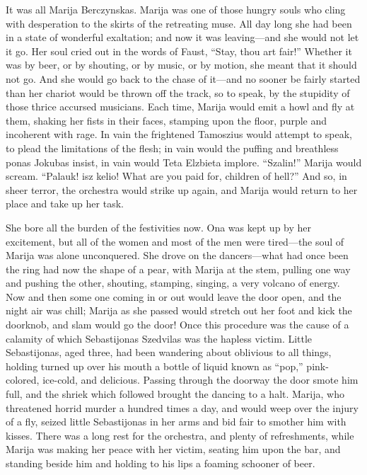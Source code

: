 \documentclass[
]{book}
\theoremstyle{definition}
\theoremstyle{definition}
\theoremstyle{definition}
\theoremstyle{definition}
\theoremstyle{remark}
\begin{document}
It was all Marija Berczynskas. Marija was one of those hungry souls who cling with desperation to the skirts of the retreating muse. All day long she had been in a state of wonderful exaltation; and now it was leaving---and she would not let it go. Her soul cried out in the words of Faust, ``Stay, thou art fair!'' Whether it was by beer, or by shouting, or by music, or by motion, she meant that it should not go. And she would go back to the chase of it---and no sooner be fairly started than her chariot would be thrown off the track, so to speak, by the stupidity of those thrice accursed musicians. Each time, Marija would emit a howl and fly at them, shaking her fists in their faces, stamping upon the floor, purple and incoherent with rage. In vain the frightened Tamoszius would attempt to speak, to plead the limitations of the flesh; in vain would the puffing and breathless ponas Jokubas insist, in vain would Teta Elzbieta implore. ``Szalin!'' Marija would scream. ``Palauk! isz kelio! What are you paid for, children of hell?'' And so, in sheer terror, the orchestra would strike up again, and Marija would return to her place and take up her task.

She bore all the burden of the festivities now. Ona was kept up by her excitement, but all of the women and most of the men were tired---the soul of Marija was alone unconquered. She drove on the dancers---what had once been the ring had now the shape of a pear, with Marija at the stem, pulling one way and pushing the other, shouting, stamping, singing, a very volcano of energy. Now and then some one coming in or out would leave the door open, and the night air was chill; Marija as she passed would stretch out her foot and kick the doorknob, and slam would go the door! Once this procedure was the cause of a calamity of which Sebastijonas Szedvilas was the hapless victim. Little Sebastijonas, aged three, had been wandering about oblivious to all things, holding turned up over his mouth a bottle of liquid known as ``pop,'' pink-colored, ice-cold, and delicious. Passing through the doorway the door smote him full, and the shriek which followed brought the dancing to a halt. Marija, who threatened horrid murder a hundred times a day, and would weep over the injury of a fly, seized little Sebastijonas in her arms and bid fair to smother him with kisses. There was a long rest for the orchestra, and plenty of refreshments, while Marija was making her peace with her victim, seating him upon the bar, and standing beside him and holding to his lips a foaming schooner of beer.
\end{document}
